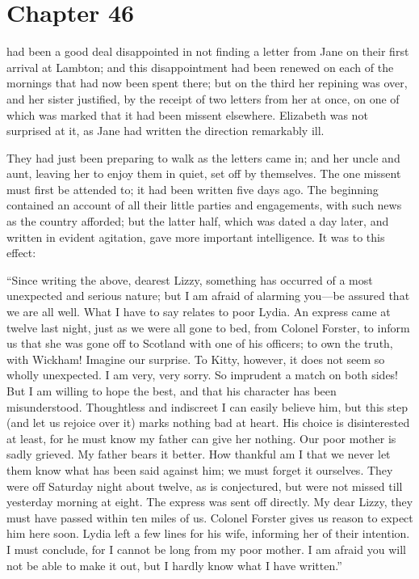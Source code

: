 \chapter{Chapter 46}


 had been a good deal disappointed in not finding a
letter from Jane on their first arrival at Lambton; and this
disappointment had been renewed on each of the mornings that
had now been spent there; but on the third her repining was
over, and her sister justified, by the receipt of two letters
from her at once, on one of which was marked that it had been
missent elsewhere.  Elizabeth was not surprised at it, as Jane
had written the direction remarkably ill.

They had just been preparing to walk as the letters came in;
and her uncle and aunt, leaving her to enjoy them in quiet, set
off by themselves.  The one missent must first be attended to;
it had been written five days ago.  The beginning contained an
account of all their little parties and engagements, with such
news as the country afforded; but the latter half, which was
dated a day later, and written in evident agitation, gave more
important intelligence.  It was to this effect:

\bigskip
``Since writing the above, dearest Lizzy, something has occurred
of a most unexpected and serious nature; but I am afraid of
alarming you---be assured that we are all well.  What I have to
say relates to poor Lydia.  An express came at twelve last night,
just as we were all gone to bed, from Colonel Forster, to
inform us that she was gone off to Scotland with one of his
officers; to own the truth, with Wickham!  Imagine our surprise.
To Kitty, however, it does not seem so wholly unexpected.  I
am very, very sorry.  So imprudent a match on both sides! But
I am willing to hope the best, and that his character has been
misunderstood.  Thoughtless and indiscreet I can easily believe
him, but this step (and let us rejoice over it) marks nothing bad
at heart.  His choice is disinterested at least, for he must know
my father can give her nothing.  Our poor mother is sadly
grieved.  My father bears it better.  How thankful am I that we
never let them know what has been said against him; we must
forget it ourselves.  They were off Saturday night about twelve,
as is conjectured, but were not missed till yesterday morning at
eight.  The express was sent off directly.  My dear Lizzy, they
must have passed within ten miles of us.  Colonel Forster gives
us reason to expect him here soon.  Lydia left a few lines for
his wife, informing her of their intention.  I must conclude, for
I cannot be long from my poor mother.  I am afraid you will not
be able to make it out, but I hardly know what I have written.''
\bigskip

